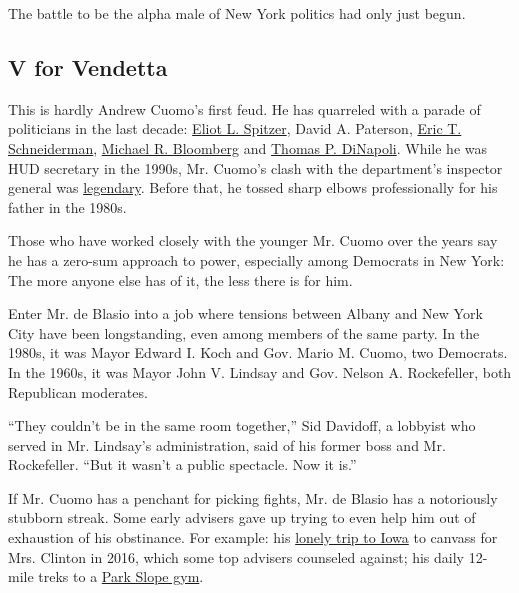 The battle to be the alpha male of New York politics had only just
begun.

\hypertarget{v-for-vendetta}{%
\subsection{V for Vendetta}\label{v-for-vendetta}}

This is hardly Andrew Cuomo's first feud. He has quarreled with a parade
of politicians in the last decade:
\href{https://www.nytimes3xbfgragh.onion/2010/09/24/nyregion/24spitzer.html}{Eliot
L. Spitzer}, David A. Paterson,
\href{https://www.nytimes3xbfgragh.onion/2014/01/16/nyregion/cuomo-and-schneiderman-prepare-to-fight-over-jpmorgan-settlement.html}{Eric
T. Schneiderman},
\href{https://www.nytimes3xbfgragh.onion/2011/12/24/nyregion/for-cuomo-and-bloomberg-the-friction-doesnt-let-up.html?_r=2\&hp\&pagewanted=all}{Michael
R. Bloomberg} and
\href{http://www.nydailynews.com/news/politics/cuomo-rips-dinapoli-investing-underperforming-hedge-funds-article-1.2834063}{Thomas
P. DiNapoli}. While he was HUD secretary in the 1990s, Mr. Cuomo's clash
with the department's inspector general was
\href{https://www.washingtonpost.com/archive/politics/2001/05/06/inspector-general-at-hud-to-retire/8b50f131-956a-41b1-9b1d-4f58670e5f1c/?utm_term=.5cc1fc3acbcf}{legendary}.
Before that, he tossed sharp elbows professionally for his father in the
1980s.

Those who have worked closely with the younger Mr. Cuomo over the years
say he has a zero-sum approach to power, especially among Democrats in
New York: The more anyone else has of it, the less there is for him.

Enter Mr. de Blasio into a job where tensions between Albany and New
York City have been longstanding, even among members of the same party.
In the 1980s, it was Mayor Edward I. Koch and Gov. Mario M. Cuomo, two
Democrats. In the 1960s, it was Mayor John V. Lindsay and Gov. Nelson A.
Rockefeller, both Republican moderates.

``They couldn't be in the same room together,'' Sid Davidoff, a lobbyist
who served in Mr. Lindsay's administration, said of his former boss and
Mr. Rockefeller. ``But it wasn't a public spectacle. Now it is.''

If Mr. Cuomo has a penchant for picking fights, Mr. de Blasio has a
notoriously stubborn streak. Some early advisers gave up trying to even
help him out of exhaustion of his obstinance. For example: his
\href{https://www.nytimes3xbfgragh.onion/2016/01/31/nyregion/de-blasio-arrives-in-iowa-to-help-hillary-clinton-in-last-push-before-caucuses.html}{lonely
trip to Iowa} to canvass for Mrs. Clinton in 2016, which some top
advisers counseled against; his daily 12-mile treks to a
\href{https://www.nytimes3xbfgragh.onion/2016/08/03/nyregion/de-blasio-ymca-workout-police-protest.html}{Park
Slope gym}.

